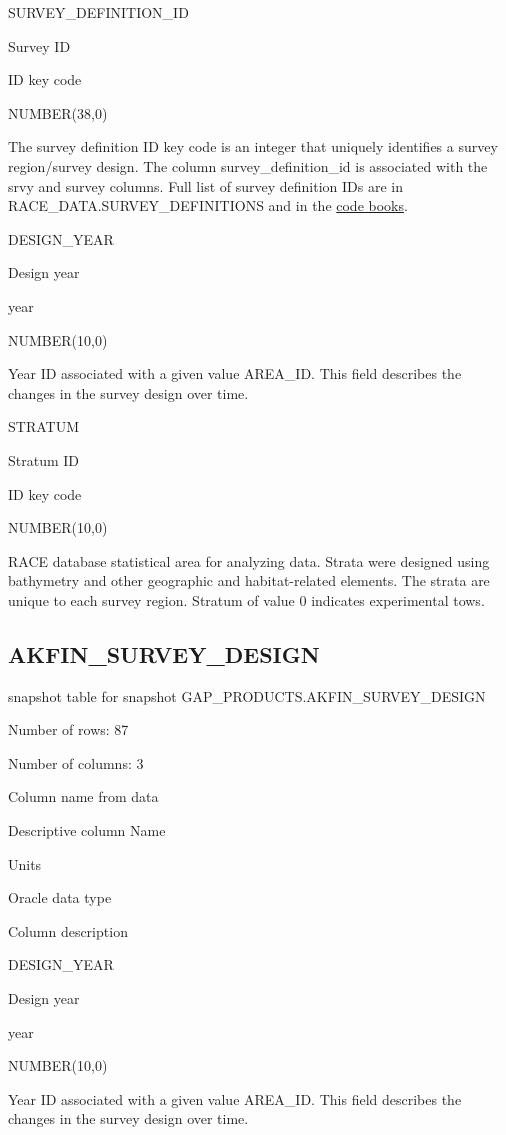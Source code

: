 \documentclass[
  letterpaper,
  oneside,
  open=any]{scrbook}
\begin{document}
SURVEY\_DEFINITION\_ID

Survey ID

ID key code

NUMBER(38,0)

The survey definition ID key code is an integer that uniquely identifies
a survey region/survey design. The column survey\_definition\_id is
associated with the srvy and survey columns. Full list of survey
definition IDs are in RACE\_DATA.SURVEY\_DEFINITIONS and in the
\href{https://www.fisheries.noaa.gov/resource/document/groundfish-survey-species-code-manual-and-data-codes-manual}{code
books}.

DESIGN\_YEAR

Design year

year

NUMBER(10,0)

Year ID associated with a given value AREA\_ID. This field describes the
changes in the survey design over time.

STRATUM

Stratum ID

ID key code

NUMBER(10,0)

RACE database statistical area for analyzing data. Strata were designed
using bathymetry and other geographic and habitat-related elements. The
strata are unique to each survey region. Stratum of value 0 indicates
experimental tows.

\subsection{AKFIN\_SURVEY\_DESIGN}\label{akfin_survey_design}

snapshot table for snapshot GAP\_PRODUCTS.AKFIN\_SURVEY\_DESIGN

Number of rows: 87

Number of columns: 3

Column name from data

Descriptive column Name

Units

Oracle data type

Column description

DESIGN\_YEAR

Design year

year

NUMBER(10,0)

Year ID associated with a given value AREA\_ID. This field describes the
changes in the survey design over time.
\end{document}
